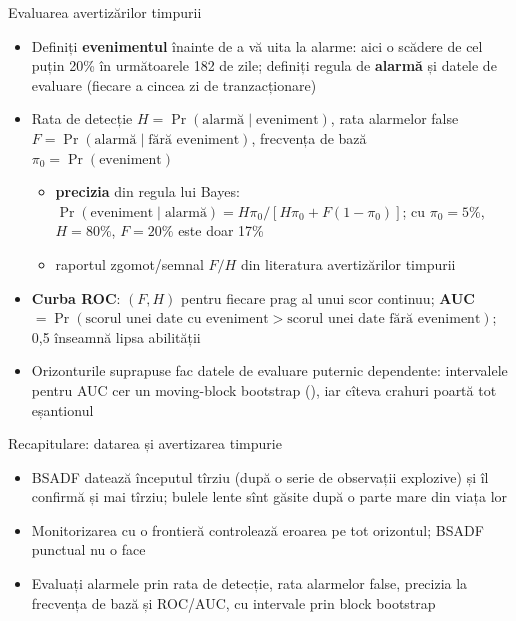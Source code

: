 \begin{frame}{Evaluarea avertizărilor timpurii}
\itemsize{\small}
\begin{itemize}
    \item Definiți \textbf{evenimentul} înainte de a vă uita la alarme: aici o scădere de cel puțin 20\% în următoarele 182 de zile; definiți regula de \textbf{alarmă} și datele de evaluare (fiecare a cincea zi de tranzacționare)
    \item Rata de detecție $H = \Pr(\text{alarmă} \mid \text{eveniment})$, rata alarmelor false $F = \Pr(\text{alarmă} \mid \text{fără eveniment})$, frecvența de bază $\pi_0 = \Pr(\text{eveniment})$
    \begin{itemize}
        \item \textbf{precizia} din regula lui Bayes: $\Pr(\text{eveniment} \mid \text{alarmă}) = H\pi_0 / [H\pi_0 + F(1 - \pi_0)]$; cu $\pi_0 = 5\%$, $H = 80\%$, $F = 20\%$ este doar 17\%
        \item raportul zgomot/semnal $F/H$ din literatura avertizărilor timpurii 
    \end{itemize}
    \item \textbf{Curba ROC}: $(F, H)$ pentru fiecare prag al unui scor continuu; \textbf{AUC} $= \Pr(\text{scorul unei date cu eveniment} > \text{scorul unei date fără eveniment})$; 0,5 înseamnă lipsa abilității
    \item Orizonturile suprapuse fac datele de evaluare puternic dependente: intervalele pentru AUC cer un moving-block bootstrap (), iar cîteva crahuri poartă tot eșantionul
\end{itemize}
\end{frame}

\begin{frame}{Recapitulare: datarea și avertizarea timpurie}
\itemsize{\small}
\begin{itemize}
    \item BSADF datează începutul tîrziu (după o serie de observații explozive) și îl confirmă și mai tîrziu; bulele lente sînt găsite după o parte mare din viața lor
    \item Monitorizarea cu o frontieră controlează eroarea pe tot orizontul; BSADF punctual nu o face
    \item Evaluați alarmele prin rata de detecție, rata alarmelor false, precizia la frecvența de bază și ROC/AUC, cu intervale prin block bootstrap
\end{itemize}
\end{frame}



